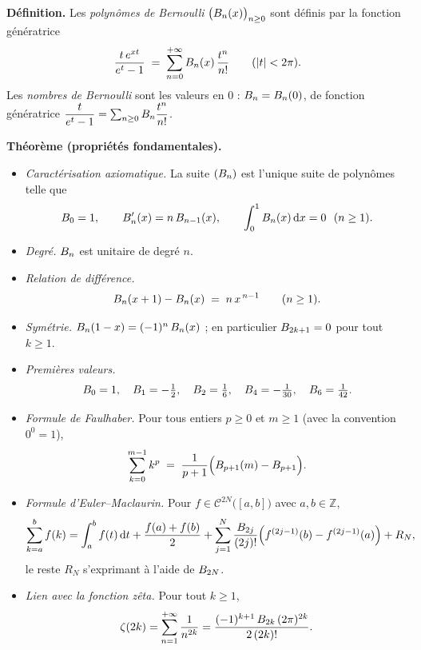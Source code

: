 \begin{tcolorbox}[thmbox]
  \textbf{Définition.}\enspace{}
  Les \emph{polynômes de Bernoulli} $\bigl(B_{n}(x)\bigr)_{n\geq 0}$ sont définis
  par la fonction génératrice
  \[
    \frac{t\,e^{xt}}{e^{t}-1} \;=\; \sum_{n=0}^{+\infty} B_{n}(x)\,\frac{t^{n}}{n!}
    \qquad (|t|<2\pi).
  \]
  Les \emph{nombres de Bernoulli} sont les valeurs en $0$ : $B_{n}=B_{n}(0)$,
  de fonction génératrice $\dfrac{t}{e^{t}-1}=\sum_{n\geq 0}B_{n}\dfrac{t^{n}}{n!}$.

  \medskip
  \textbf{Théorème (propriétés fondamentales).}
  \begin{itemize}
    \item \textit{Caractérisation axiomatique.} La suite $(B_{n})$ est l'unique
    suite de polynômes telle que
    \[
      B_{0}=1,\qquad B_{n}'(x)=n\,B_{n-1}(x),\qquad
      \int_{0}^{1}B_{n}(x)\,\mathrm{d}x=0\ \ (n\geq 1).
    \]
    \item \textit{Degré.} $B_{n}$ est unitaire de degré $n$.
    \item \textit{Relation de différence.}
    \[
      B_{n}(x+1)-B_{n}(x) \;=\; n\,x^{\,n-1} \qquad (n\geq 1).
    \]
    \item \textit{Symétrie.} $B_{n}(1-x)=(-1)^{n}\,B_{n}(x)$ ; en particulier
    $B_{2k+1}=0$ pour tout $k\geq 1$.
    \item \textit{Premières valeurs.}
    \[
      B_{0}=1,\quad B_{1}=-\tfrac{1}{2},\quad B_{2}=\tfrac{1}{6},\quad
      B_{4}=-\tfrac{1}{30},\quad B_{6}=\tfrac{1}{42}.
    \]
    \item \textit{Formule de Faulhaber.} Pour tous
    entiers $p\geq 0$ et $m\geq 1$ (avec la convention $0^{0}=1$),
    \[
      \sum_{k=0}^{m-1} k^{p}
      \;=\; \frac{1}{p+1}\Bigl(B_{p+1}(m)-B_{p+1}\Bigr).
    \]
    \item \textit{Formule d'Euler--Maclaurin.}
    Pour $f\in\mathcal{C}^{2N}\bigl([a,b]\bigr)$ avec $a,b\in\mathbb{Z}$,
    \[
      \sum_{k=a}^{b} f(k)
      = \int_{a}^{b} f(t)\,\mathrm{d}t
      + \frac{f(a)+f(b)}{2}
      + \sum_{j=1}^{N}\frac{B_{2j}}{(2j)!}\Bigl(f^{(2j-1)}(b)-f^{(2j-1)}(a)\Bigr)
      + R_{N},
    \]
    le reste $R_{N}$ s'exprimant à l'aide de $B_{2N}$.
    \item \textit{Lien avec la fonction zêta.}
    Pour tout $k\geq 1$,
    \[
      \zeta(2k)=\sum_{n=1}^{+\infty}\frac{1}{n^{2k}}
      =\frac{(-1)^{k+1}\,B_{2k}\,(2\pi)^{2k}}{2\,(2k)!}.
    \]
  \end{itemize}
\end{tcolorbox}

